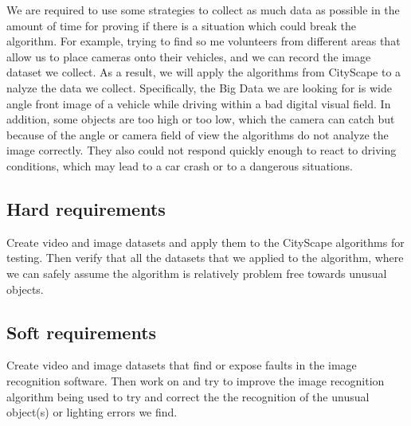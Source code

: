 \documentclass[letterpaper,10pt]{article}
\begin{document}
    We are required to use some strategies to collect as much data as possible in the amount of time for proving if there is a situation which could break the algorithm. For example, trying to find so    me volunteers from different areas that allow us to place cameras onto their vehicles, and we can record the image dataset we collect. As a result, we will apply the algorithms from CityScape to a    nalyze the data we collect. Specifically, the Big Data we are looking for is wide angle front image of a vehicle while driving within a bad digital visual field. In addition, some objects are too     high or too low, which the camera can catch but because of the angle or camera field of view the algorithms do not analyze the image correctly. They also could not respond quickly enough to react     to driving conditions, which may lead to a car crash or to a dangerous situations.

    \subsection{Hard requirements}

    Create video and image datasets and apply them to the CityScape algorithms for testing. Then verify that all the datasets that we applied to the algorithm, where we can safely assume the algorithm    is relatively problem free towards unusual objects.

    \subsection{Soft requirements}

    Create video and image datasets that find or expose faults in the image recognition software. Then work on and try to improve the image recognition algorithm being used to try and correct the the     recognition of the unusual object(s) or lighting errors we find.

\end{document}
